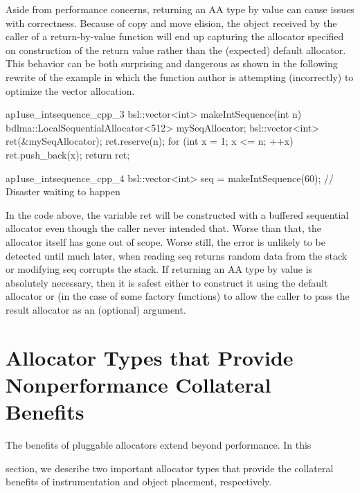 Aside from performance concerns, returning an AA type by value can cause
issues with correctness. Because of copy and move elision, the object received
by the caller of a return-by-value function will end up capturing the allocator
specified on construction of the return value rather than the (expected) default
allocator. This behavior can be both surprising and dangerous as shown in the
following rewrite of the  example in which the function author
is attempting (incorrectly) to optimize the vector allocation.
\begin{cppcodeblock}{ap1use_intsequence_cpp_3}
    bsl::vector<int> makeIntSequence(int n) {
        bdlma::LocalSequentialAllocator<512> mySeqAllocator;
        bsl::vector<int> ret(&mySeqAllocator);
        ret.reserve(n);
        for (int x = 1; x <= n; ++x) {
            ret.push_back(x);
        }
        return ret;
    }
\end{cppcodeblock}
\begin{cppcodeblock}{ap1use_intsequence_cpp_4}
    bsl::vector<int> seq = makeIntSequence(60); // Disaster waiting to happen
\end{cppcodeblock}
In the code above, the variable ret will be constructed with a buffered
sequential allocator even though the caller never intended that. Worse than
that, the allocator itself has gone out of scope. Worse still, the error is unlikely
to be detected until much later, when reading seq returns random data from
the stack or modifying seq corrupts the stack. If returning an AA type by value
is absolutely necessary, then it is safest either to construct it using the default
allocator or (in the case of some factory functions) to allow the caller to pass
the result allocator as an (optional) argument.

\section{Allocator Types that Provide Nonperformance Collateral Benefits}
The benefits of pluggable allocators extend beyond performance. In this

section, we describe two important allocator types that provide the collateral
benefits of instrumentation and object placement, respectively.

\subsection{}

